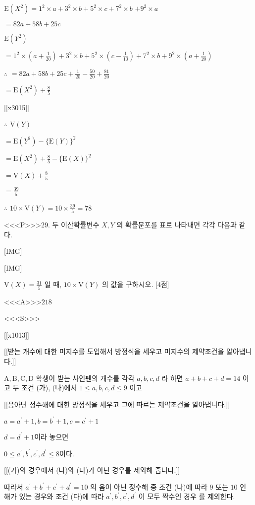 \documentclass{oblivoir}
\begin{document}
$\mathrm{E}\left(X^{2}\right)=1^{2} \times a+3^{2} \times b+5^{2} \times c+7^{2} \times b$
$+9^{2} \times a$

$=82 a+58 b+25 c$

$ \mathrm{E}\left(Y^{2}\right)$

$=1^{2} \times\left(a+\frac{1}{20}\right)+3^{2} \times b+5^{2} \times\left(c-\frac{1}{10}\right) +7^{2} \times b+9^{2} \times\left(a+\frac{1}{20}\right)$

$\therefore$ $=82 a+58 b+25 c+\frac{1}{20}-\frac{50}{20}+\frac{81}{20}$

$= \mathrm{E}\left(X^{2}\right)+\frac{8}{5}$

[[x3015]]

$\therefore$ $\mathrm{V}(Y)$

$=\mathrm{E}\left(Y^{2}\right)-\{\mathrm{E}(Y)\}^{2}$

$=\mathrm{E}\left(X^{2}\right)+\frac{8}{5}-\{\mathrm{E}(X)\}^{2}$

$=\mathrm{V}(X)+\frac{8}{5}$

$=\frac{39}{5}$

$\therefore$ $10 \times \mathrm{V}(Y)=10 \times \frac{39}{5}=78 $


<<<P>>>29. 두 이산확률변수 $X, Y$ 의 확률분포를 표로 나타내면 각각 다음과 같다.

[IMG]

[IMG]

$\mathrm{V}(X)=\frac{31}{5}$ 일 때, $10 \times \mathrm{V}(Y)$ 의 값을 구하시오. [4점]

<<<A>>>$218$

<<<S>>>

[[x1013]]

[[받는 개수에 대한 미지수를 도입해서 방정식을 세우고 미지수의 제약조건을 알아냅니다.]]

$\mathrm{A}, \mathrm{B}, \mathrm{C}, \mathrm{D}$ 학생이 받는 사인펜의 개수를 각각 $a, b, c, d$ 라 하면 $a+b+c+d=14$ 이고
두 조건 (가), (나)에서 $1 \leq a, b, c, d \leq 9$ 이고

[[음아닌 정수해에 대한 방정식을 세우고 그에 따르는 제약조건을 알아냅니다.]]

$a=a^{\prime}+1, b=b^{\prime}+1, c=c^{\prime}+1$

$d=d^{\prime}+1$이라 놓으면

$0 \leq a^{\prime}, b^{\prime}, c^{\prime}, d^{\prime} \leq 8 $이다.

[[(가)의 경우에서 (나)와 (다)가 아닌 경우를 제외해 줍니다.]]

따라서 $a^{\prime}+b^{\prime}+c^{\prime}+d^{\prime}=10$ 의 음이 아닌 정수해 중 
조건 (나)에 따라 $9$ 또는 $10$ 인 해가 있는 경우와 
조건 (다)에 따라 $a^{\prime}, b^{\prime}, c^{\prime}, d^{\prime}$ 이 모두 짝수인 경우 를 제외한다.
\end{document}
